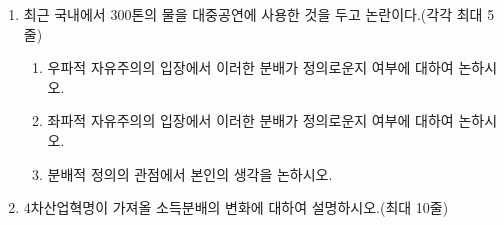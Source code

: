 \documentclass{article}
\begin{document}
\begin{enumerate}[{\bf 문제 \arabic*.}]
\begin{enumerate}
        \end{enumerate}
    \item 최근 국내에서 300톤의 물을 대중공연에 사용한 것을 두고 논란이다.(각각 최대 5줄)
        \begin{enumerate}
            \item 우파적 자유주의의 입장에서 이러한 분배가 정의로운지 여부에 대하여 논하시오.
            \item 좌파적 자유주의의 입장에서 이러한 분배가 정의로운지 여부에 대하여 논하시오.
            \item 분배적 정의의 관점에서 본인의 생각을 논하시오.
        \end{enumerate}
    \item 4차산업혁명이 가져올 소득분배의 변화에 대하여 설명하시오.(최대 10줄)
\end{enumerate}
\end{document}
